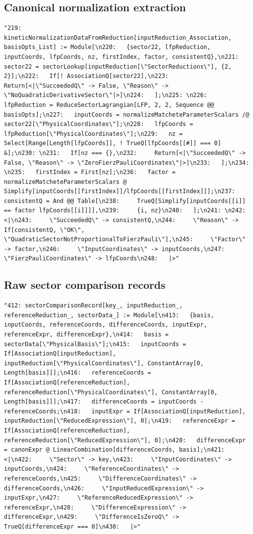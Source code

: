 \documentclass[11pt]{article}
\begin{document}
\subsection{Canonical normalization extraction}
\begin{verbatim}
"219: kineticNormalizationDataFromReduction[inputReduction_Association, basisOpts_List] := Module[\n220:   {sector22, lfpReduction, inputCoords, lfpCoords, nz, firstIndex, factor, consistentQ},\n221:   sector22 = sectorLookup[inputReduction[\"SectorReductions\"], {2, 2}];\n222:   If[! AssociationQ[sector22],\n223:     Return[<|\"SucceededQ\" -> False, \"Reason\" -> \"NoQuadraticDerivativeSector\"|>]\n224:   ];\n225: \n226:   lfpReduction = ReduceSectorLagrangian[LFP, 2, 2, Sequence @@ basisOpts];\n227:   inputCoords = normalizeMatcheteParameterScalars /@ sector22[\"PhysicalCoordinates\"];\n228:   lfpCoords = lfpReduction[\"PhysicalCoordinates\"];\n229:   nz = Select[Range[Length[lfpCoords]], ! TrueQ[lfpCoords[[#]] === 0] &];\n230: \n231:   If[nz === {},\n232:     Return[<|\"SucceededQ\" -> False, \"Reason\" -> \"ZeroFierzPauliCoordinates\"|>]\n233:   ];\n234: \n235:   firstIndex = First[nz];\n236:   factor = normalizeMatcheteParameterScalars @ Simplify[inputCoords[[firstIndex]]/lfpCoords[[firstIndex]]];\n237:   consistentQ = And @@ Table[\n238:     TrueQ[Simplify[inputCoords[[i]] == factor lfpCoords[[i]]]],\n239:     {i, nz}\n240:   ];\n241: \n242:   <|\n243:     \"SucceededQ\" -> consistentQ,\n244:     \"Reason\" -> If[consistentQ, \"OK\", \"QuadraticSectorNotProportionalToFierzPauli\"],\n245:     \"Factor\" -> factor,\n246:     \"InputCoordinates\" -> inputCoords,\n247:     \"FierzPauliCoordinates\" -> lfpCoords\n248:   |>"
\end{verbatim}
\subsection{Raw sector comparison records}
\begin{verbatim}
"412: sectorComparisonRecord[key_, inputReduction_, referenceReduction_, sectorData_] := Module[\n413:   {basis, inputCoords, referenceCoords, differenceCoords, inputExpr, referenceExpr, differenceExpr},\n414:   basis = sectorData[\"PhysicalBasis\"];\n415:   inputCoords = If[AssociationQ[inputReduction], inputReduction[\"PhysicalCoordinates\"], ConstantArray[0, Length[basis]]];\n416:   referenceCoords = If[AssociationQ[referenceReduction], referenceReduction[\"PhysicalCoordinates\"], ConstantArray[0, Length[basis]]];\n417:   differenceCoords = inputCoords - referenceCoords;\n418:   inputExpr = If[AssociationQ[inputReduction], inputReduction[\"ReducedExpression\"], 0];\n419:   referenceExpr = If[AssociationQ[referenceReduction], referenceReduction[\"ReducedExpression\"], 0];\n420:   differenceExpr = canonExpr @ LinearCombination[differenceCoords, basis];\n421:   <|\n422:     \"Sector\" -> key,\n423:     \"InputCoordinates\" -> inputCoords,\n424:     \"ReferenceCoordinates\" -> referenceCoords,\n425:     \"DifferenceCoordinates\" -> differenceCoords,\n426:     \"InputReducedExpression\" -> inputExpr,\n427:     \"ReferenceReducedExpression\" -> referenceExpr,\n428:     \"DifferenceExpression\" -> differenceExpr,\n429:     \"DifferenceIsZeroQ\" -> TrueQ[differenceExpr === 0]\n430:   |>"
\end{verbatim}
\end{document}
